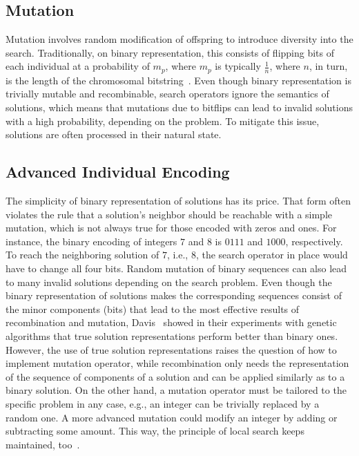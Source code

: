 \documentclass[paper=a4,%
  twoside,%
  BCOR4mm,%
  abstract=true,%
  toc=bibliography,%
  chapterprefix=true,%
  toc=bibliographynumbered,%
  open=right,%
  english,%
  pagesize=pdftex]{scrreprt}
\begin{document}
\subsection{Mutation}
Mutation involves random modification of offspring to introduce diversity into the search. Traditionally, on binary representation, this consists of flipping bits of each individual at a probability of $m_p$, where $m_p$ is typically $\frac{1}{n}$, where $n$, in turn, is the length of the chromosomal bitstring~\cite{Harman2010a}. Even though binary representation is trivially mutable and recombinable, search operators ignore the semantics of solutions, which means that mutations due to bitflips can lead to invalid solutions with a high probability, depending on the problem. To mitigate this issue, solutions are often processed in their natural state.

\subsection{Advanced Individual Encoding}
The simplicity of binary representation of solutions has its price. That form often violates the rule that a solution's neighbor should be reachable with a simple mutation, which is not always true for those encoded with zeros and ones. For instance, the binary encoding of integers $7$ and $8$ is $0111$ and $1000$, respectively. To reach the neighboring solution of $7$, i.e., $8$, the search operator in place would have to change all four bits. Random mutation of binary sequences can also lead to many invalid solutions depending on the search problem. Even though the binary representation of solutions makes the corresponding sequences consist of the minor components (bits) that lead to the most effective results of recombination and mutation, Davis~\cite{Davis1991} showed in their experiments with genetic algorithms that true solution representations perform better than binary ones. However, the use of true solution representations raises the question of how to implement mutation operator, while recombination only needs the representation of the sequence of components of a solution and can be applied similarly as to a binary solution. On the other hand, a mutation operator must be tailored to the specific problem in any case, e.g., an integer can be trivially replaced by a random one. A more advanced mutation could modify an integer by adding or subtracting some amount. This way, the principle of local search keeps maintained, too~\cite{Davis1991}.
\end{document}
